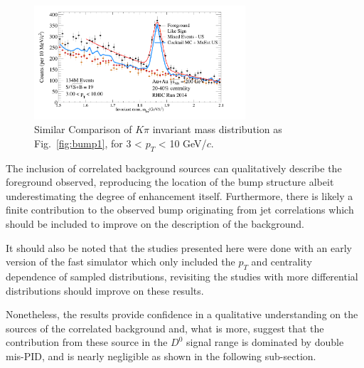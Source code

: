 \begin{figure}[htbp]
\centering
\includegraphics[keepaspectratio,width=0.7\textwidth]{figure/Run14_D0HFT/D0_FG_EvMcBg_cocktail_2040_3_pT_10.png}
\caption{Similar Comparison of $K\pi$ invariant mass distribution as Fig.~\ref{fig:bump1}, for 3 < $p_T$ < 10 GeV/$c$.}
\label{fig:bump2}
\end{figure}

The inclusion of correlated background sources can qualitatively describe the foreground observed, reproducing the location of the bump structure albeit underestimating the degree of enhancement itself. Furthermore, there is likely a finite contribution to the observed bump originating from jet correlations which should be included to improve on the description of the background.

It should also be noted that the studies presented here were done with an early version of the fast simulator which only included the $p_T$ and centrality dependence of sampled distributions, revisiting the studies with more differential distributions should improve on these results.

Nonetheless, the results provide confidence in a qualitative understanding on the sources of the correlated background and, what is more, suggest that the contribution from these source in the $D^0$ signal range is dominated by double mis-PID, and is nearly negligible as shown in the following sub-section.

